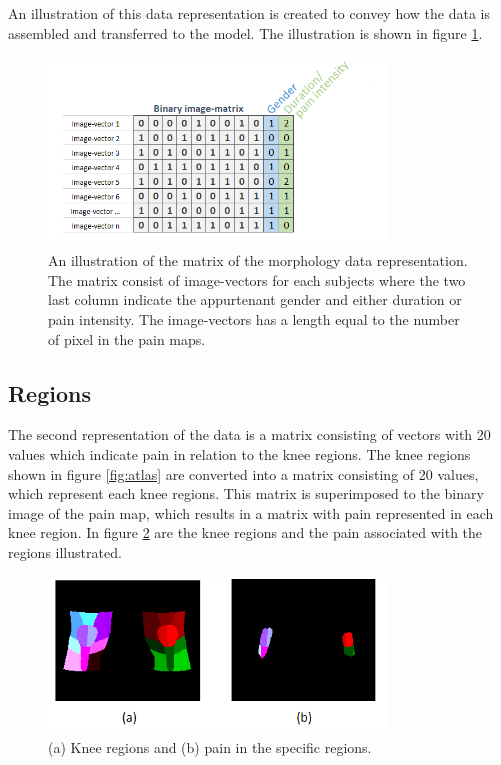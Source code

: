 \noindent
An illustration of this data representation is created to convey how the data is assembled and transferred to the model. The illustration is shown in figure \ref{fig:binmatrix}.

\begin{figure} [H]
\centering
\includegraphics[width=0.8\textwidth]{figures/binaryimagematrix}
\caption{An illustration of the matrix of the morphology data representation. The matrix consist of image-vectors for each subjects where the two last column indicate the appurtenant gender and either duration or pain intensity. The image-vectors has a length equal to the number of pixel in the pain maps.}
\label{fig:binmatrix}
\end{figure}


\subsection{Regions}
The second representation of the data is a matrix consisting of vectors with 20 values which indicate pain in relation to the knee regions.
The knee regions shown in figure \ref{fig:atlas} are converted into a matrix consisting of 20 values, which represent each knee regions. This matrix is superimposed to the binary image of the pain map, which results in a matrix with pain represented in each knee region. In figure \ref{fig:binregions} are the knee regions and the pain associated with the regions illustrated.

\begin{figure} [H]
\centering
\includegraphics[width=0.8\textwidth]{figures/binregions}
\caption{(a) Knee regions and (b) pain in the specific regions.}
\label{fig:binregions}
\end{figure}

